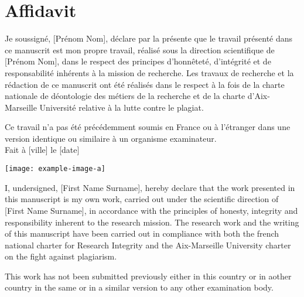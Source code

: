 \newpage
\chapter*{Affidavit}					
\thispagestyle{empty}
\iftrue %
    Je soussigné, [Prénom Nom], %
    déclare par la présente que le travail présenté dans ce manuscrit est mon propre travail, réalisé sous la direction scientifique de [Prénom Nom], %
    dans le respect des principes d’honnêteté, d'intégrité et de responsabilité inhérents à la mission de recherche. Les travaux de recherche et la rédaction de ce manuscrit ont été réalisés dans le respect à la fois de la charte nationale de déontologie des métiers de la recherche et de la charte d’Aix-Marseille Université relative à la lutte contre le plagiat.
    
    Ce travail n'a pas été précédemment soumis en France ou à l'étranger dans une version identique ou similaire à un organisme examinateur.\\
    
    Fait à [ville] le [date]
    
    \begin{flushright}\texttt{[image: example-image-a]}\end{flushright}%
\fi

\iffalse %
    I, undersigned, [First Name Surname], %
    hereby declare that the work presented in this manuscript is my own work, carried out under the scientific direction of [First Name Surname], %
    in accordance with the principles of honesty, integrity and responsibility inherent to the research mission. The research work and the writing of this manuscript have been carried out in compliance with both the french national charter for Research Integrity and the Aix-Marseille University charter on the fight against plagiarism.
    
    This work has not been submitted previously either in this country or in aother country in the same or in a similar version to any other examination body.\\
    
